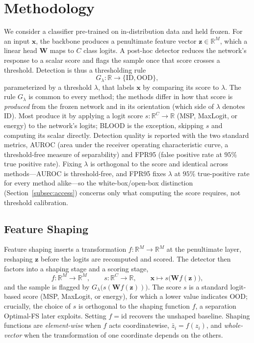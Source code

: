 \documentclass[a4paper]{article}
\begin{document}
\section{Methodology}
\label{sec:methodology}

We consider a classifier pre-trained on in-distribution data and held frozen.
For an input $\mathbf{x}$, the backbone produces a penultimate feature vector
$\mathbf{z} \in \mathbb{R}^{M}$, which a linear head $\mathbf{W}$ maps to $C$ class
logits. A post-hoc detector reduces the network's response to a scalar score and
flags the sample once that score crosses a
threshold. Detection is thus a thresholding rule
\begin{equation}
G_\lambda : \mathbb{R} \to \{\text{ID}, \text{OOD}\},
\end{equation}
parameterized by a threshold $\lambda$, that labels $\mathbf{x}$ by comparing its score
to $\lambda$. The rule $G_\lambda$ is common to every method; the methods differ in how
that score is \emph{produced} from the frozen network and in its orientation (which
side of $\lambda$ denotes ID). Most produce it by applying a logit score
$s : \mathbb{R}^{C} \to \mathbb{R}$ (MSP, MaxLogit, or energy) to the network's logits;
BLOOD is the exception, skipping $s$ and computing its scalar directly. Detection quality is reported
with the two standard metrics, AUROC (area under the receiver operating characteristic
curve, a threshold-free measure of separability) and FPR95 (false positive rate at
$95\%$ true positive rate). Fixing $\lambda$ is orthogonal to the score and identical
across methods---AUROC is threshold-free, and FPR95 fixes $\lambda$ at $95\%$
true-positive rate for every method alike---so the white-box/open-box distinction
(Section~\ref{subsec:access}) concerns only what computing the score requires, not
threshold calibration.

\subsection{Feature Shaping}
\label{subsec:shaping}

Feature shaping inserts a transformation $f : \mathbb{R}^{M} \to \mathbb{R}^{M}$ at
the penultimate layer, reshaping $\mathbf{z}$ before the logits are recomputed and
scored. The detector then factors into a shaping stage and a scoring stage,
\begin{equation}
f : \mathbb{R}^{M} \to \mathbb{R}^{M}, \qquad
s : \mathbb{R}^{C} \to \mathbb{R}, \qquad
\mathbf{x} \mapsto s\big(\mathbf{W} f(\mathbf{z})\big),
\end{equation}
and the sample is flagged by $G_\lambda\big(s(\mathbf{W} f(\mathbf{z}))\big)$.
The score $s$ is a standard logit-based score (MSP, MaxLogit, or energy), for which
a lower value indicates OOD; crucially, the choice of $s$ is orthogonal to the
shaping function $f$, a separation Optimal-FS later exploits. Setting
$f = \mathrm{id}$ recovers the unshaped baseline. Shaping functions are
\emph{element-wise} when $f$ acts coordinatewise, $\bar{z}_i = f(z_i)$, and
\emph{whole-vector} when the transformation of one coordinate depends on the others.
\end{document}
